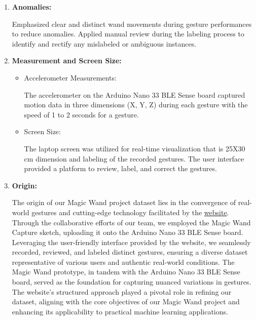 \begin{enumerate}
\begin{lstlisting}
    \end{lstlisting}
    
    \item \textbf{Anomalies:}
    
    Emphasized clear and distinct wand movements during gesture performances to reduce anomalies. Applied manual review during the labeling process to identify and rectify any mislabeled or ambiguous instances.
    
    \item  \textbf{Measurement and Screen Size:}
    
    \begin{itemize}
        
        \item Accelerometer Measurements:
        
        The accelerometer on the Arduino Nano 33 BLE Sense board captured motion data in three dimensions (X, Y, Z) during each gesture with the speed of 1 to 2 seconds for a gesture. 
        
        \item Screen Size:
        
        The laptop screen was utilized for real-time visualization that is 25X30 cm dimension and labeling of the recorded gestures. The user interface provided a platform to review, label, and correct the gestures.
        
    \end{itemize}
    
    \item \textbf{Origin:}
    
    The origin of our Magic Wand project dataset lies in the convergence of real-world gestures and cutting-edge technology facilitated by the \href{https://tinyml.seas.harvard.edu/magic_wand/}{website}. Through the collaborative efforts of our team, we employed the Magic Wand Capture sketch, uploading it onto the Arduino Nano 33 BLE Sense board. Leveraging the user-friendly interface provided by the website, we seamlessly recorded, reviewed, and labeled distinct gestures, ensuring a diverse dataset representative of various users and authentic real-world conditions. The Magic Wand prototype, in tandem with the Arduino Nano 33 BLE Sense board, served as the foundation for capturing nuanced variations in gestures. The website's structured approach played a pivotal role in refining our dataset, aligning with the core objectives of our Magic Wand project and enhancing its applicability to practical machine learning applications.
    
\end{enumerate}

